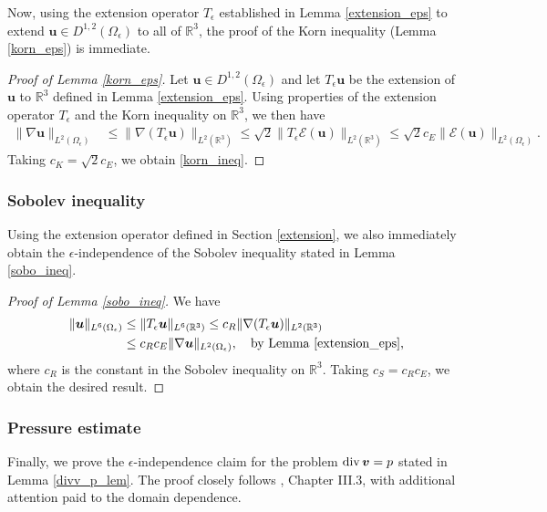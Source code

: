 \documentclass[11pt]{article}
\numberwithin{equation}{section}
\newcommand{\R}{\mathbb{R}}
\newcommand{\bu}{\bm{u}}
\newcommand{\bv}{\bm{v}}
\newcommand{\ts}{\thinspace}
\newcommand{\dive}{{\rm{div}}}
\theoremstyle{definition}
\begin{document}
Now, using the extension operator $T_{\epsilon}$ established in Lemma \ref{extension_eps} to extend $\bu\in D^{1,2}(\Omega_{\epsilon})$ to all of $\R^3$, the proof of the Korn inequality (Lemma \ref{korn_eps}) is immediate.

\begin{proof}[Proof of Lemma \ref{korn_eps}]
Let $\bu \in D^{1,2}(\Omega_{\epsilon})$ and let $T_\epsilon\bu$ be the extension of $\bu$ to $\R^3$ defined in Lemma \ref{extension_eps}. Using properties of the extension operator $T_{\epsilon}$ and the Korn inequality on $\R^3$, we then have
\begin{align*}
\|\nabla \bu\|_{L^2(\Omega_{\epsilon})} &\le \|\nabla (T_{\epsilon}\bu)\|_{L^2(\R^3)} \le \sqrt{2}\|T_{\epsilon}\mathcal{E}(\bu)\|_{L^2(\R^3)} \le \sqrt{2}c_E \| \mathcal{E}(\bu) \|_{L^2(\Omega_{\epsilon})}.
\end{align*}
 Taking $c_K=\sqrt{2}c_E$, we obtain \eqref{korn_ineq}. 
\end{proof}


\subsubsection{Sobolev inequality}\label{Sob_ineq}
Using the extension operator defined in Section \ref{extension}, we also immediately obtain the $\epsilon$-independence of the Sobolev inequality stated in Lemma \ref{sobo_ineq}.
\begin{proof}[Proof of Lemma \ref{sobo_ineq}]
We have
\begin{align*}
\| \bu\|_{L^6(\Omega_{\epsilon})} &\le \| T_{\epsilon}\bu\|_{L^6(\R^3)} \le  c_R\| \nabla (T_{\epsilon}\bu)\|_{L^2(\R^3)} \\
&\le  c_R c_{E}\| \nabla \bu\|_{L^2(\Omega_{\epsilon})}, \quad \text{by Lemma \ref{extension_eps},}
\end{align*}
where $c_R$ is the constant in the Sobolev inequality on $\R^3$. Taking $c_S=c_Rc_E$, we obtain the desired result. 
\end{proof}



\subsubsection{Pressure estimate}\label{pressure_const}
Finally, we prove the $\epsilon$-independence claim for the problem $\dive\ts\bv=p$ stated in Lemma \ref{divv_p_lem}. The proof closely follows \cite{galdi2011introduction}, Chapter III.3, with additional attention paid to the domain dependence.
\end{document}
